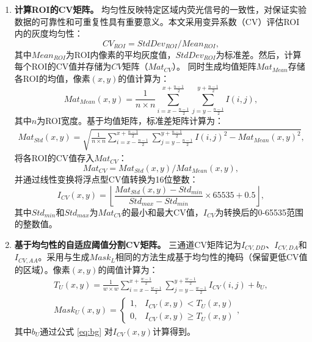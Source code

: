 \begin{enumerate}
\item \textbf{计算ROI的CV矩阵。}  
均匀性反映特定区域内荧光信号的一致性，对保证实验数据的可靠性和可重复性具有重要意义。本文采用变异系数（CV）评估ROI内的灰度均匀性：
\begin{equation}
   {CV}_{ROI}={StdDev}_{ROI} / {Mean}_{ROI},
    \label{eq4}
\end{equation}
其中${Mean}_{ROI}$为ROI内像素的平均灰度值，${StdDev}_{ROI}$为标准差。然后，计算每个ROI的CV值并存储为$CV$矩阵（${Mat}_{CV}$）。  
同时生成均值矩阵${Mat}_{Mean}$存储各ROI的均值，像素$(x,y)$的值计算为：
\begin{equation}    
    {Mat}_{Mean}(x,y)=\frac{1}{n \times n} \sum_{i=x- \frac{n-1}{2}}^{x+\frac{n-1}{2}} \sum_{j=y-\frac{n-1}{2}}^{y+\frac{n-1}{2}} I(i,j),
    \label{eq5}
\end{equation}
其中$n$为ROI宽度。基于均值矩阵，标准差矩阵计算为：
\begin{equation}
    \begin{split}
    {Mat}_{Std}(x,y)=
    \sqrt{\frac{1}{n \times n} \sum_{i=x-\frac{n-1}{2}}^{x+\frac{n-1}{2}} \sum_{j=y-\frac{n-1}{2}}^{y+\frac{n-1}{2}}{I(i,j)}^2-{{Mat}_{Mean}(x,y)}^2},
    \end{split}
    \label{eq6}
\end{equation}
将各ROI的CV值存入${Mat}_{CV}$：
\begin{equation}
    {Mat}_{CV}={Mat}_{Std}(x,y)/{Mat}_{Mean}(x,y),
    \label{eq7}
\end{equation}
并通过线性变换将浮点型CV值转换为16位整数：
\begin{equation}
    {I}_{CV}(x,y)=\left\lfloor\frac{{Mat}_{Std}(x,y)-{Std}_{min}} {{Std}_{max}-{Std}_{min}}\times65535 + 0.5\right\rfloor,
\end{equation}
其中${Std}_{min}$和${Std}_{max}$为${Mat}_{CV}$的最小和最大CV值，$I_{CV}$为转换后的0-65535范围的整数值。

\item \textbf{基于均匀性的自适应阈值分割CV矩阵。}  
三通道CV矩阵记为$I_{CV, DD}$、$I_{CV, DA}$和$I_{CV,AA}$。采用与生成${Mask}_{L}$相同的方法生成基于均匀性的掩码（保留更低CV值的区域）。像素$(x,y)$的阈值计算为：
\begin{align}
    T_U(x, y)=\frac{1}{w \times w} \sum_{i=x-\frac{w-1}{2}}^{x+\frac{w-1}{2}} \sum_{j=y-\frac{w-1}{2}}^{y+\frac{w-1}{2}} {I}_{CV}(i, j)+b_U,
    \label{eq8} \\
    {Mask}_U(x,y)=\begin{cases}1,&I_{CV}(x,y) < T_U(x, y)\\ 0,&I_{CV}(x, y) \ge T_U(x, y)\end{cases},
    \label{eq9}
\end{align}
其中$b_U$通过公式 \ref{eq:bg} 对$I_{CV}(x,y)$计算得到。


\end{enumerate}
